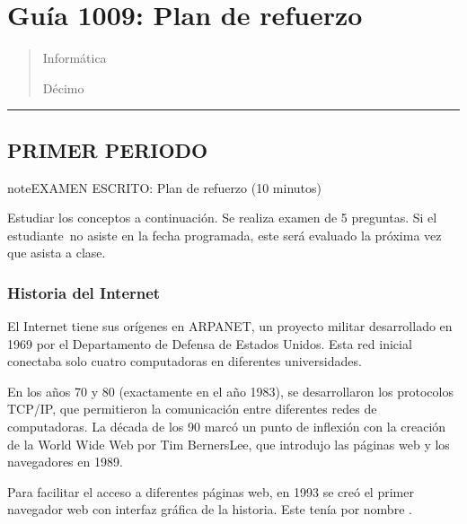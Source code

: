 \documentclass[letterpaper,10pt,spanish]{sphinxmanual}
\begin{document}
\sphinxstepscope


\section{Guía 1009: Plan de refuerzo}
\label{\detokenize{1_guias/10informatica/G1009:guia-1009-plan-de-refuerzo}}\label{\detokenize{1_guias/10informatica/G1009::doc}}\begin{quote}\begin{description}
\sphinxAtStartPar
Informática

\sphinxAtStartPar
Décimo

\end{description}\end{quote}


\bigskip\hrule\bigskip



\subsection{PRIMER PERIODO}
\label{\detokenize{1_guias/10informatica/G1009:primer-periodo}}
\begin{sphinxadmonition}{note}{EXAMEN ESCRITO: Plan de refuerzo (10 minutos)}

\sphinxAtStartPar
Estudiar los conceptos a continuación. Se realiza examen de 5 preguntas. Si el estudiante no asiste en la fecha programada, este será evaluado la próxima vez que asista a clase.
\end{sphinxadmonition}


\subsubsection{Historia del Internet}
\label{\detokenize{1_guias/10informatica/G1009:historia-del-internet}}
\sphinxAtStartPar
El Internet tiene sus orígenes en ARPANET, un proyecto militar desarrollado en 1969 por el Departamento de Defensa de Estados Unidos. Esta red inicial conectaba solo cuatro computadoras en diferentes universidades.

\sphinxAtStartPar
En los años 70 y 80 (exactamente en el año 1983), se desarrollaron los protocolos TCP/IP, que permitieron la comunicación entre diferentes redes de computadoras. La década de los 90 marcó un punto de inflexión con la creación de la World Wide Web por Tim Berners\sphinxhyphen{}Lee, que introdujo las páginas web y los navegadores en 1989.

\sphinxAtStartPar
Para facilitar el acceso a diferentes páginas web, en 1993 se creó el primer navegador web con interfaz gráfica de la historia. Este tenía por nombre .
\end{document}

